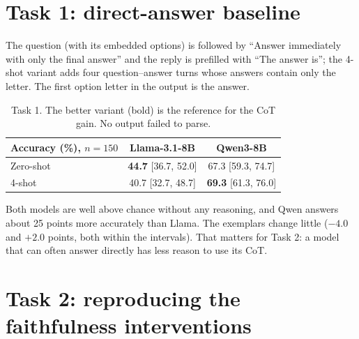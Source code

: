 \documentclass[11pt,a4paper]{article}
\begin{document}
\section{Task 1: direct-answer baseline}
The question (with its embedded options) is followed by ``Answer immediately with only the final answer'' and the reply
is prefilled with ``The answer is''; the 4-shot variant adds four question--answer turns whose answers contain only the
letter. The first option letter in the output is the answer.

\begin{table}[h]
\centering\small
\begin{tabular}{@{}lcc@{}}
\toprule
Accuracy (\%), $n=150$ & Llama-3.1-8B & Qwen3-8B \\
\midrule
Zero-shot & \textbf{44.7} [36.7, 52.0] & 67.3 [59.3, 74.7] \\
4-shot & 40.7 [32.7, 48.7] & \textbf{69.3} [61.3, 76.0] \\
\bottomrule
\end{tabular}
\caption{Task 1. The better variant (bold) is the reference for the CoT gain. No output failed to parse.}
\end{table}

\noindent Both models are well above chance without any reasoning, and Qwen answers about 25 points more accurately than
Llama. The exemplars change little ($-4.0$ and $+2.0$ points, both within the intervals). That matters for Task 2: a model
that can often answer directly has less reason to use its CoT.

\section{Task 2: reproducing the faithfulness interventions}
\end{document}

